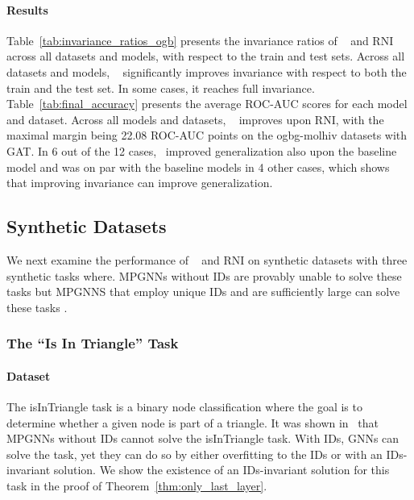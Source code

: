 \paragraph{Results} Table~\ref{tab:invariance_ratios_ogb} presents the invariance ratios of \ourmethod~ and RNI across all datasets and models, with respect to the train and test sets. Across all datasets and models, \ourmethod~ significantly improves invariance with respect to both the train and the test set. In some cases, it reaches full invariance. 
Table~\ref{tab:final_accuracy} presents the average ROC-AUC scores for each model and dataset. Across all models and datasets, \ourmethod~ improves upon RNI, with the maximal margin being 22.08 ROC-AUC points on the ogbg-molhiv datasets with GAT. In $6$ out of the 12 cases, \ourmethod~improved generalization also upon the baseline model and was on par with the baseline models in 4 other cases, which shows that improving invariance can improve generalization. 

\subsection{Synthetic Datasets}

We next examine the performance of \ourmethod~ and RNI on synthetic datasets with three synthetic tasks where. MPGNNs without IDs are provably unable to solve these tasks \cite{chen2020graphneuralnetworkscount, garg2020generalizationrepresentationallimitsgraph, abboud2021surprisingpowergraphneural} but MPGNNS that employ unique IDs and are sufficiently large can solve these tasks \cite{abboud2021surprisingpowergraphneural}.

\subsubsection{The ``Is In Triangle'' Task}

\paragraph{Dataset}
The isInTriangle task is a binary node classification where the goal is to determine whether a given node is part of a triangle. It was shown in~\citet{chen2020graphneuralnetworkscount, garg2020generalizationrepresentationallimitsgraph} that MPGNNs without IDs cannot solve the isInTriangle task. With IDs, GNNs can solve the task, yet they can do so by either overfitting to the IDs or with an IDs-invariant solution. We show the existence of an IDs-invariant solution for this task in the proof of Theorem~\ref{thm:only_last_layer}.

